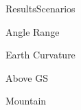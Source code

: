 
\begin{frame}{Results}{Scenarios}
  \begin{block}{Angle Range}

  \end{block}
  
  \begin{block}{Earth Curvature}

  \end{block}

  \begin{block}{Above GS}

  \end{block}

  \begin{block}{Mountain}

  \end{block}
\end{frame}